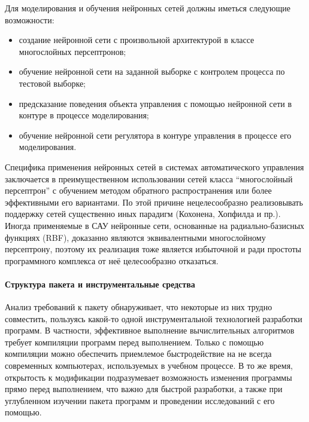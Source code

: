 Для моделирования и обучения нейронных сетей должны иметься следующие
возможности:
\begin{itemize}
\item создание нейронной сети с произвольной архитектурой в классе
  многослойных персептронов;
\item обучение нейронной сети на заданной выборке с контролем процесса
  по тестовой выборке;
\item предсказание поведения объекта управления с помощью нейронной
  сети в контуре в процессе моделирования;
\item обучение нейронной сети регулятора в контуре управления в
  процессе его моделирования.
\end{itemize}

Специфика применения нейронных сетей в системах автоматического
управления заключается в преимущественном использовании сетей класса
``многослойный персептрон'' с обучением методом обратного
распространения или более эффективными его вариантами.  По этой
причине нецелесообразно реализовывать поддержку сетей существенно иных
парадигм (Кохонена, Хопфилда и пр.).  Иногда применяемые в САУ
нейронные сети, основанные на радиально-базисных функциях (RBF),
доказанно являются эквивалентными многослойному персептрону, поэтому
их реализация тоже является избыточной и ради простоты программного
комплекса от неё целесообразно отказаться.

\paragraph{Структура пакета и инструментальные средства}

Анализ требований к пакету обнаруживает, что некоторые из них трудно
совместить, пользуясь какой-то одной инструментальной технологией
разработки программ.  В частности, эффективное выполнение
вычислительных алгоритмов требует компиляции программ перед
выполнением.  Только с помощью компиляции можно обеспечить приемлемое
быстродействие на не всегда современных компьютерах, используемых в
учебном процессе.  В то же время, открытость к модификации
подразумевает возможность изменения программы прямо перед выполнением,
что важно для быстрой разработки, а также при углубленном изучении
пакета программ и проведении исследований с его помощью.

